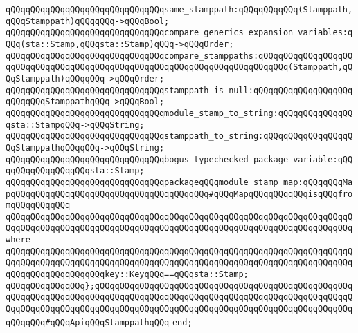 \verb|qQQqqQQqqQQqqQQqqQQqqQQqqQQqqQQqsame_stamppath:qQQqqQQqqQQq(Stamppath,qQQqStamppath)qQQqqQQq->qQQqBool;|\newline
\newline
\verb|qQQqqQQqqQQqqQQqqQQqqQQqqQQqqQQqcompare_generics_expansion_variables:qQQq(sta::Stamp,qQQqsta::Stamp)qQQq->qQQqOrder;|\newline
\verb|qQQqqQQqqQQqqQQqqQQqqQQqqQQqqQQqcompare_stamppaths:qQQqqQQqqQQqqQQqqQQqqQQqqQQqqQQqqQQqqQQqqQQqqQQqqQQqqQQqqQQqqQQqqQQqqQQqqQQq(Stamppath,qQQqStamppath)qQQqqQQq->qQQqOrder;|\newline
\newline
\verb|qQQqqQQqqQQqqQQqqQQqqQQqqQQqqQQqstamppath_is_null:qQQqqQQqqQQqqQQqqQQqqQQqqQQqStamppathqQQq->qQQqBool;|\newline
\newline
\verb|qQQqqQQqqQQqqQQqqQQqqQQqqQQqqQQqmodule_stamp_to_string:qQQqqQQqqQQqqQQqsta::StampqQQq->qQQqString;|\newline
\verb|qQQqqQQqqQQqqQQqqQQqqQQqqQQqqQQqstamppath_to_string:qQQqqQQqqQQqqQQqqQQqStamppathqQQqqQQq->qQQqString;|\newline
\newline
\verb|qQQqqQQqqQQqqQQqqQQqqQQqqQQqqQQqbogus_typechecked_package_variable:qQQqqQQqqQQqqQQqqQQqsta::Stamp;|\newline
\newline
\verb|qQQqqQQqqQQqqQQqqQQqqQQqqQQqqQQqpackageqQQqmodule_stamp_map:qQQqqQQqMapqQQqqQQqqQQqqQQqqQQqqQQqqQQqqQQqqQQqqQQq#qQQqMapqQQqqQQqqQQqisqQQqfromqQQqqQQqqQQq|\newline
\verb|qQQqqQQqqQQqqQQqqQQqqQQqqQQqqQQqqQQqqQQqqQQqqQQqqQQqqQQqqQQqqQQqqQQqqQQqqQQqqQQqqQQqqQQqqQQqqQQqqQQqqQQqqQQqqQQqqQQqqQQqqQQqqQQqqQQqqQQqqQQqwhere|\newline
\verb|qQQqqQQqqQQqqQQqqQQqqQQqqQQqqQQqqQQqqQQqqQQqqQQqqQQqqQQqqQQqqQQqqQQqqQQqqQQqqQQqqQQqqQQqqQQqqQQqqQQqqQQqqQQqqQQqqQQqqQQqqQQqqQQqqQQqqQQqqQQqqQQqqQQqqQQqqQQqqQQqkey::KeyqQQq==qQQqsta::Stamp;|\newline
\newline
\verb|qQQqqQQqqQQqqQQq};qQQqqQQqqQQqqQQqqQQqqQQqqQQqqQQqqQQqqQQqqQQqqQQqqQQqqQQqqQQqqQQqqQQqqQQqqQQqqQQqqQQqqQQqqQQqqQQqqQQqqQQqqQQqqQQqqQQqqQQqqQQqqQQqqQQqqQQqqQQqqQQqqQQqqQQqqQQqqQQqqQQqqQQqqQQqqQQqqQQqqQQqqQQqqQQqqQQqqQQq#qQQqApiqQQqStamppathqQQq|\newline
\verb|end;|\newline
\newline
\newline

